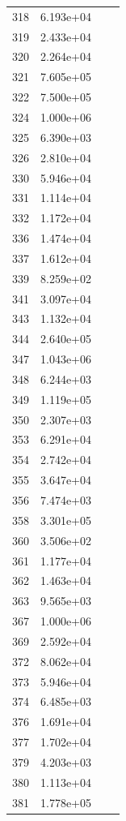 \documentclass[12pt]{article}
\begin{document}
\begin{longtable}{@{}cccc@{}}
318 & 6.193e+04 &  &  \\
319 & 2.433e+04 &  &  \\
320 & 2.264e+04 &  &  \\
321 & 7.605e+05 &  &  \\
322 & 7.500e+05 &  &  \\
324 & 1.000e+06 &  &  \\
325 & 6.390e+03 &  &  \\
326 & 2.810e+04 &  &  \\
330 & 5.946e+04 &  &  \\
331 & 1.114e+04 &  &  \\
332 & 1.172e+04 &  &  \\
336 & 1.474e+04 &  &  \\
337 & 1.612e+04 &  &  \\
339 & 8.259e+02 &  &  \\
341 & 3.097e+04 &  &  \\
343 & 1.132e+04 &  &  \\
344 & 2.640e+05 &  &  \\
347 & 1.043e+06 &  &  \\
348 & 6.244e+03 &  &  \\
349 & 1.119e+05 &  &  \\
350 & 2.307e+03 &  &  \\
353 & 6.291e+04 &  &  \\
354 & 2.742e+04 &  &  \\
355 & 3.647e+04 &  &  \\
356 & 7.474e+03 &  &  \\
358 & 3.301e+05 &  &  \\
360 & 3.506e+02 &  &  \\
361 & 1.177e+04 &  &  \\
362 & 1.463e+04 &  &  \\
363 & 9.565e+03 &  &  \\
367 & 1.000e+06 &  &  \\
369 & 2.592e+04 &  &  \\
372 & 8.062e+04 &  &  \\
373 & 5.946e+04 &  &  \\
374 & 6.485e+03 &  &  \\
376 & 1.691e+04 &  &  \\
377 & 1.702e+04 &  &  \\
379 & 4.203e+03 &  &  \\
380 & 1.113e+04 &  &  \\
381 & 1.778e+05 &  &  \\

\end{longtable}
\end{document}

